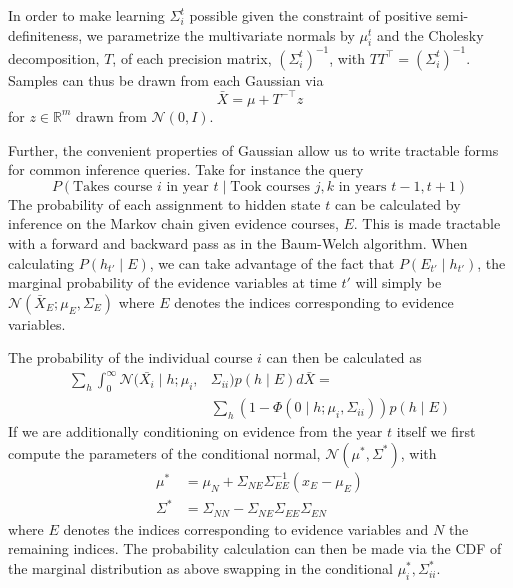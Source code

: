 \documentclass{edm_template}
\begin{document}
In order to make learning $\Sigma^t_i$ possible given the constraint of positive semi-definiteness, we parametrize the multivariate normals by $\mu_i^t$ and the Cholesky decomposition, $T$, of each precision matrix, $(\Sigma^t_i)^{-1}$, with $TT^\top = (\Sigma^t_i)^{-1}$. Samples can thus be drawn from each Gaussian via 
$$\bar{X} = \mu + T^{-\top} z$$ 
for $z \in \mathbb{R}^m$ drawn from $\mathcal{N}(0,I)$. 

Further, the convenient properties of Gaussian allow us to write tractable forms for common inference queries. Take for instance the query
$$P(\text{Takes course } i \text{ in year } t \mid \text{Took courses } j,k \text { in years } t-1,t+1)$$
The probability of each assignment to hidden state $t$ can be calculated by inference on the Markov chain given evidence courses, $E$. This is made tractable with a forward and backward pass as in the Baum-Welch algorithm. When calculating $P(h_{t'} \mid E)$, we can take advantage of the fact that $P(E_{t'} \mid h_{t'})$, the marginal probability of the evidence variables at time $t'$ will simply be $\mathcal{N}(\bar{X}_E;\mu_E,\Sigma_E)$ where $E$ denotes the indices corresponding to evidence variables. 

The probability of the individual course $i$ can then be calculated as 
\begin{align*}
\sum_h \int_0^{\infty} \mathcal{N}(\bar{X_i} \mid h; \mu_i,&\Sigma_{ii}) p(h \mid E) d\bar{X} = \\
&\sum_h (1 - \Phi(0 \mid h ; \mu_i,\Sigma_{ii})) p(h \mid E)
\end{align*}
If we are additionally conditioning on evidence from the year $t$ itself we first compute the parameters of the conditional normal, $\mathcal{N}(\mu^*, \Sigma^*)$, with 
\begin{align*}
\mu^* &= \mu_{N} + \Sigma_{N E} \Sigma_{E E}^{-1} (x_E - \mu_E) \\
\Sigma^* &= \Sigma_{N N} - \Sigma_{N E} \Sigma_{E E} \Sigma_{E N}
\end{align*}
where $E$ denotes the indices corresponding to evidence variables and $N$ the remaining indices. The probability calculation can then be made via the CDF of the marginal distribution as above swapping in the conditional $\mu_i^*, \Sigma_{ii}^*$.
\end{document}
